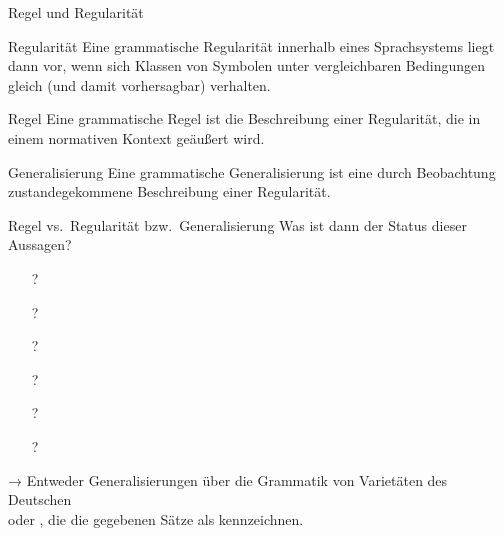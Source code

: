 \begin{frame}
  {Regel und Regularität}
  \onslide<+->
  \onslide<+->
  \begin{block}{Regularität}
    Eine grammatische Regularität innerhalb eines Sprachsystems liegt dann vor, wenn sich Klassen von Symbolen unter vergleichbaren Bedingungen gleich (und damit vorhersagbar) verhalten.
  \end{block}

  \onslide<+->
  \Halbzeile

  \begin{block}{Regel}
    Eine grammatische Regel ist die Beschreibung einer Regularität, die in einem normativen Kontext geäußert wird.
  \end{block}

  \onslide<+->
  \Halbzeile
  
  \begin{block}{Generalisierung}
    Eine grammatische Generalisierung ist eine durch Beobachtung zustandegekommene Beschreibung einer Regularität.
  \end{block}
\end{frame}

\begin{frame}
  {Regel vs.\ Regularität bzw.\ Generalisierung}
  \onslide<+->
  \onslide<+->
  Was ist dann der Status dieser Aussagen?\\
  \Zeile 
  \onslide<+->
  \begin{itemize}
    \item[?] 
    \item[?] 
    \item[?] 
    \item[?] 
    \item[?] 
    \item[?] 
  \end{itemize}
  \Zeile
  \onslide<+->
  → Entweder \alert{Generalisierungen} über die Grammatik von \alert{Varietäten des Deutschen} \\
  oder , die die gegebenen Sätze als  kennzeichnen.
\end{frame}

